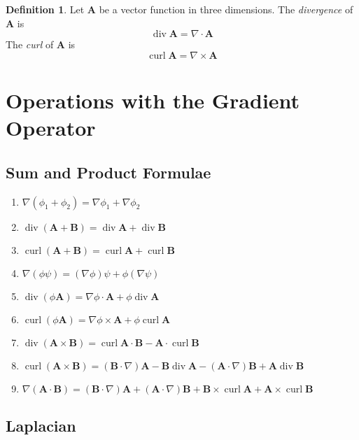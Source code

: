 \documentclass{article}
\theoremstyle{definition}
\theoremstyle{definition}
\newtheorem*{defn}{Definition}
\theoremstyle{remark}
\newcommand{\vecA}{\mathbf{A}}
\newcommand{\vecB}{\mathbf{B}}
\DeclareMathOperator{\vdiv}{div}
\DeclareMathOperator{\vcurl}{curl}
\begin{document}
\begin{defn}
Let $\vecA$ be a vector function in three dimensions. The \emph{divergence} of $\vecA$ is
\begin{equation*}
    \vdiv \vecA = \nabla \cdot \vecA
\end{equation*}
The \emph{curl} of $\vecA$ is
\begin{equation*}
    \vcurl \vecA = \nabla \times \vecA
\end{equation*}
\end{defn}

\section{Operations with the Gradient Operator}

\subsection{Sum and Product Formulae}

\begin{enumerate}
    \item $\nabla (\phi_1 + \phi_2) = \nabla \phi_1 + \nabla \phi_2$
    \item $\vdiv (\vecA + \vecB) = \vdiv \vecA + \vdiv \vecB$
    \item $\vcurl (\vecA + \vecB) = \vcurl \vecA + \vcurl \vecB$
    \item $\nabla (\phi \psi) = (\nabla \phi) \psi + \phi (\nabla \psi)$
    \item $\vdiv (\phi \vecA) = \nabla \phi \cdot \vecA + \phi \vdiv \vecA$
    \item $\vcurl (\phi \vecA) = \nabla \phi \times \vecA + \phi \vcurl \vecA$
    \item $\vdiv (\vecA \times \vecB) = \vcurl \vecA \cdot \vecB - \vecA \cdot \vcurl \vecB$
    \item $\vcurl (\vecA \times \vecB) = (\vecB \cdot \nabla) \vecA - \vecB \vdiv \vecA - (\vecA \cdot \nabla) \vecB + \vecA \vdiv \vecB$
    \item $\nabla (\vecA \cdot \vecB) = (\vecB \cdot \nabla) \vecA + (\vecA \cdot \nabla) \vecB + \vecB \times \vcurl \vecA + \vecA \times \vcurl \vecB$
\end{enumerate}

\subsection{Laplacian}
\end{document}
